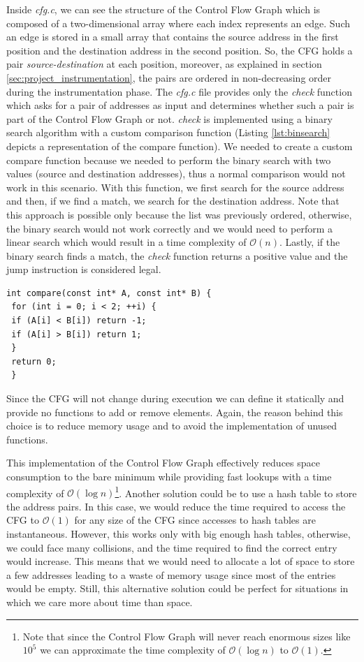Inside \textit{cfg.c}, we can see the structure of the Control Flow Graph which is
composed of a two-dimensional array where each index represents an edge. Such an
edge is stored in a small array that contains the source address in the first
position and the destination address in the second position. So, the CFG holds a
pair \textit{source-destination} at each position, moreover, as explained in section
\ref{sec:project_instrumentation}, the pairs are ordered in non-decreasing order
during the instrumentation phase. The \textit{cfg.c} file provides only the
\textit{check} function which asks for a pair of addresses as input and determines
whether such a pair is part of the Control Flow Graph or not. \textit{check} is implemented
using a binary search algorithm with a custom comparison function (Listing
\ref{lst:binsearch} depicts a representation of the compare function). We needed
to create a custom compare function because we needed to perform the binary
search with two values (source and destination addresses), thus a normal comparison
would not work in this scenario. With this function, we first search for the source
address and then, if we find a match, we search for the destination address.
Note that this approach is possible only because the list was previously ordered,
otherwise, the binary search would not work correctly and we would need to
perform a linear search which would result in a time complexity of
$\mathcal{O}(n)$. Lastly, if the binary search finds a match, the \textit{check}
function returns a positive value and the jump instruction is considered legal. \\
\begin{lstlisting}[style=CStyle, caption= Comparison for binary search, label={lst:binsearch}]
 int compare(const int* A, const int* B) {
 for (int i = 0; i < 2; ++i) {
 if (A[i] < B[i]) return -1;
 if (A[i] > B[i]) return 1;
 }
 return 0;
 }
\end{lstlisting}

Since the CFG will not change during execution we can define it statically and
provide no functions to add or remove elements. Again, the reason behind this
choice is to reduce memory usage and to avoid the implementation of unused
functions.

This implementation of the Control Flow Graph effectively reduces space
consumption to the bare minimum while providing fast lookups with a time
complexity of $\mathcal{O}(\log{n})$\footnote{Note that since the Control Flow
Graph will never reach enormous sizes like $10^{5}$ we can approximate the time
complexity of $\mathcal{O}(\log{n})$ to $\mathcal{O}(1)$.}. Another solution
could be to use a hash table to store the address pairs. In this case, we would
reduce the time required to access the CFG to $\mathcal{O}(1)$ for any size of
the CFG since accesses to hash tables are instantaneous. However, this works
only with big enough hash tables, otherwise, we could face many collisions, and the
time required to find the correct entry would increase. This means that we would
need to allocate a lot of space to store a few addresses leading to a waste of
memory usage since most of the entries would be empty. Still, this alternative
solution could be perfect for situations in which we care more about time than
space.

